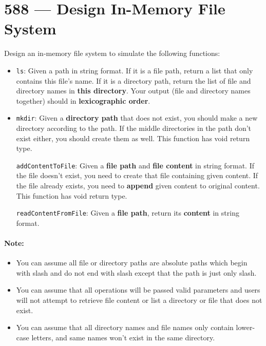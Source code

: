 \section{588 --- Design In-Memory File System}
Design an in-memory file system to simulate the following functions:

\begin{itemize}
\item \texttt{ls}: Given a path in string format. If it is a file path, return a list that only contains this file's name. If it is a directory path, return the list of file and directory names in \textbf{this directory}. Your output (file and directory names together) should in \textbf{lexicographic order}.

\item \texttt{mkdir}: Given a \textbf{directory path} that does not exist, you should make a new directory according to the path. If the middle directories in the path don't exist either, you should create them as well. This function has void return type.

\texttt{addContentToFile}: Given a \textbf{file path} and \textbf{file content} in string format. If the file doesn't exist, you need to create that file containing given content. If the file already exists, you need to \textbf{append} given content to original content. This function has void return type.

\texttt{readContentFromFile}: Given a \textbf{file path}, return its \textbf{content} in string format.
\end{itemize}

 
\paragraph{Note:}

\begin{itemize}
\item You can assume all file or directory paths are absolute paths which begin with slash and do not end with slash except that the path is just only slash.
\item You can assume that all operations will be passed valid parameters and users will not attempt to retrieve file content or list a directory or file that does not exist.
\item You can assume that all directory names and file names only contain lower-case letters, and same names won't exist in the same directory.
\end{itemize}

